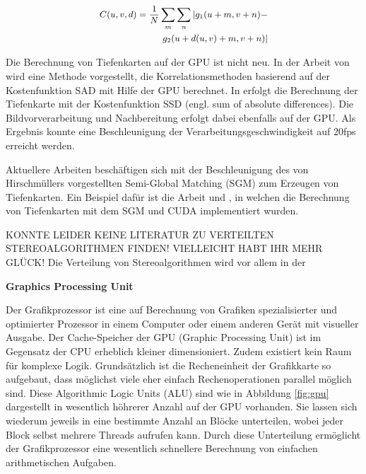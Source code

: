 \documentclass[times, 10pt,twocolumn]{article}
\begin{document}
\begin{align}
\small 
\begin{split}
C(u,v,d) = \frac{1}{N}\sum\limits_{m} \sum\limits_{n} | g_1(u+m,v+n) - \\ g_2(u+d(u,v)+m,v+n)|
\label{eq:sad}
\end{split}
\end{align}


Die Berechnung von Tiefenkarten auf der GPU ist nicht neu. In der Arbeit von \cite{Yang.2002} wird eine Methode vorgestellt, die Korrelationsmethoden basierend auf der Kostenfunktion SAD mit Hilfe der GPU berechnet. In \cite{Woetzel.2004} erfolgt die Berechnung der Tiefenkarte mit der Kostenfunktion SSD (engl. sum of absolute differences). Die Bildvorverarbeitung und Nachbereitung erfolgt dabei ebenfalls auf der GPU. Als Ergebnis konnte eine Beschleunigung der Verarbeitungsgeschwindigkeit auf 20fps erreicht werden.

Aktuellere Arbeiten beschäftigen sich mit der Beschleunigung des von Hirschmüllers vorgestellten Semi-Global Matching (SGM) \cite{Hirschmuller.2005} zum Erzeugen von Tiefenkarten. Ein Beispiel dafür ist die Arbeit \cite{Hirschmueller.2008} und \cite{Rosenberg.2006}, in welchen die Berechnung von Tiefenkarten mit dem SGM und CUDA implementiert wurden.

{\color{red}KONNTE LEIDER KEINE LITERATUR ZU VERTEILTEN STEREOALGORITHMEN FINDEN! VIELLEICHT HABT IHR MEHR GLÜCK!
Die Verteilung von Stereoalgorithmen wird vor allem in der}

 \textbf{Graphics Processing Unit}
 
Der Grafikprozessor ist eine auf Berechnung von Grafiken spezialisierter und optimierter Prozessor in einem Computer oder einem anderen Gerät mit visueller Ausgabe.
Der Cache-Speicher der GPU (Graphic Processing Unit) ist im Gegensatz der CPU erheblich kleiner dimensioniert. Zudem existiert kein Raum für komplexe Logik. Grundsätzlich ist die Recheneinheit der Grafikkarte so aufgebaut, dass möglichst viele eher einfach Rechenoperationen parallel möglich sind.
Diese Algorithmic Logic Units (ALU) sind wie in Abbildung \ref{fig:gpu} dargestellt in wesentlich höhrerer Anzahl auf der GPU vorhanden. Sie lassen sich wiederum jeweils in eine bestimmte Anzahl an Blöcke unterteilen, wobei jeder Block selbst mehrere Threads aufrufen kann. Durch diese Unterteilung ermöglicht der Grafikprozessor eine wesentlich schnellere Berechnung von einfachen arithmetischen Aufgaben.
\end{document}
